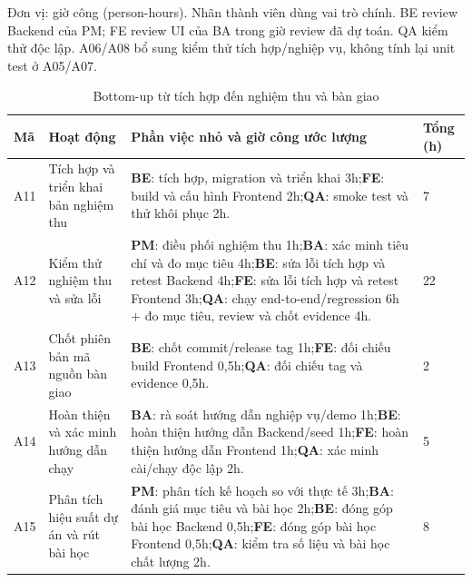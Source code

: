 \noindent Đơn vị: giờ công (person-hours). Nhãn thành viên dùng vai trò chính. BE review Backend của PM; FE review UI của BA trong giờ review đã dự toán. QA kiểm thử độc lập. A06/A08 bổ sung kiểm thử tích hợp/nghiệp vụ, không tính lại unit test ở A05/A07.
\newpage
\begin{table}[H]
\centering
\caption{Bottom-up từ tích hợp đến nghiệm thu và bàn giao}
\footnotesize
\renewcommand{\arraystretch}{1.2}
\begin{tabularx}{\linewidth}{|p{0.8cm}|p{2.8cm}|>{\raggedright\arraybackslash}X|p{0.9cm}|}
\hline
\textbf{Mã} & \textbf{Hoạt động} & \textbf{Phần việc nhỏ và giờ công ước lượng} & \textbf{Tổng (h)} \\ \hline
A11 & Tích hợp và triển khai bản nghiệm thu & \textbf{BE}: tích hợp, migration và triển khai 3h;\newline \textbf{FE}: build và cấu hình Frontend 2h;\newline \textbf{QA}: smoke test và thử khôi phục 2h. & 7 \\ \hline
A12 & Kiểm thử nghiệm thu và sửa lỗi & \textbf{PM}: điều phối nghiệm thu 1h;\newline \textbf{BA}: xác minh tiêu chí và đo mục tiêu 4h;\newline \textbf{BE}: sửa lỗi tích hợp và retest Backend 4h;\newline \textbf{FE}: sửa lỗi tích hợp và retest Frontend 3h;\newline \textbf{QA}: chạy end-to-end/regression 6h + đo mục tiêu, review và chốt evidence 4h. & 22 \\ \hline
A13 & Chốt phiên bản mã nguồn bàn giao & \textbf{BE}: chốt commit/release tag 1h;\newline \textbf{FE}: đối chiếu build Frontend 0,5h;\newline \textbf{QA}: đối chiếu tag và evidence 0,5h. & 2 \\ \hline
A14 & Hoàn thiện và xác minh hướng dẫn chạy & \textbf{BA}: rà soát hướng dẫn nghiệp vụ/demo 1h;\newline \textbf{BE}: hoàn thiện hướng dẫn Backend/seed 1h;\newline \textbf{FE}: hoàn thiện hướng dẫn Frontend 1h;\newline \textbf{QA}: xác minh cài/chạy độc lập 2h. & 5 \\ \hline
A15 & Phân tích hiệu suất dự án và rút bài học & \textbf{PM}: phân tích kế hoạch so với thực tế 3h;\newline \textbf{BA}: đánh giá mục tiêu và bài học 2h;\newline \textbf{BE}: đóng góp bài học Backend 0,5h;\newline \textbf{FE}: đóng góp bài học Frontend 0,5h;\newline \textbf{QA}: kiểm tra số liệu và bài học chất lượng 2h. & 8 \\ \hline

\end{tabularx}
\end{table}
